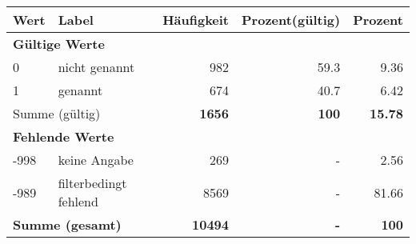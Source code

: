      \begin{longtable}{lXrrr}
     \toprule
     \textbf{Wert} & \textbf{Label} & \textbf{Häufigkeit} & \textbf{Prozent(gültig)} & \textbf{Prozent} \\
     \endhead
     \midrule
     \multicolumn{5}{l}{\textbf{Gültige Werte}}\\

     0 &
     \multicolumn{1}{X}{ nicht genannt   } &


       \num{982} &
       \num[round-mode=places,round-precision=2]{59.3} &
         \num[round-mode=places,round-precision=2]{9.36} \\

     1 &
     \multicolumn{1}{X}{ genannt   } &


       \num{674} &
       \num[round-mode=places,round-precision=2]{40.7} &
         \num[round-mode=places,round-precision=2]{6.42} \\
     \midrule
     \multicolumn{2}{l}{Summe (gültig)} &
       \textbf{\num{1656}} &
     \textbf{\num{100}} &
       \textbf{\num[round-mode=places,round-precision=2]{15.78}} \\
     \multicolumn{5}{l}{\textbf{Fehlende Werte}}\\
       -998 &
       keine Angabe &
         \num{269} &
        - &
         \num[round-mode=places,round-precision=2]{2.56} \\
       -989 &
       filterbedingt fehlend &
         \num{8569} &
        - &
         \num[round-mode=places,round-precision=2]{81.66} \\
     \midrule
     \multicolumn{2}{l}{\textbf{Summe (gesamt)}} &
          \textbf{\num{10494}} &
        \textbf{-} &
        \textbf{\num{100}} \\
     \bottomrule
     \end{longtable}
     
